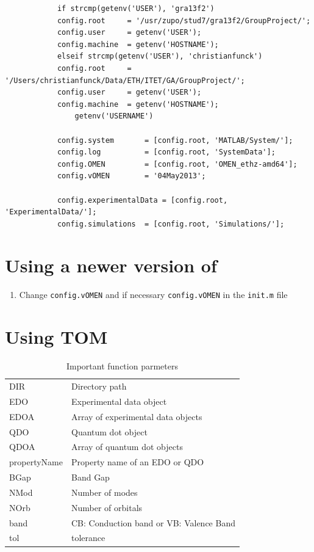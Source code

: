 		\begin{lstlisting}
			if strcmp(getenv('USER'), 'gra13f2')
		    config.root     = '/usr/zupo/stud7/gra13f2/GroupProject/';
		    config.user     = getenv('USER');
		    config.machine  = getenv('HOSTNAME');
			elseif strcmp(getenv('USER'), 'christianfunck')
		    config.root     = '/Users/christianfunck/Data/ETH/ITET/GA/GroupProject/';
		    config.user     = getenv('USER');
		    config.machine  = getenv('HOSTNAME');
		 		getenv('USERNAME')
 
			config.system       = [config.root, 'MATLAB/System/'];
			config.log          = [config.root, 'SystemData'];
			config.OMEN         = [config.root, 'OMEN_ethz-amd64'];
			config.vOMEN        = '04May2013';
		
			config.experimentalData = [config.root, 'ExperimentalData/'];
			config.simulations  = [config.root, 'Simulations/'];
		\end{lstlisting}


	\section{Using a newer version of \omen}
		\begin{enumerate}
			\item Change \lstinline{config.vOMEN} and if necessary \lstinline{config.vOMEN} in the \lstinline{init.m} file
		
		\end{enumerate}
	
	\section{Using TOM}
	
		\begin{table}[htbp]
		\begin{tabular}{ll}
			DIR						&	Directory path														\\
			EDO						& Experimental data object									\\
			EDOA					& Array of experimental data objects				\\
			QDO						& Quantum dot object												\\
			QDOA					&	Array of quantum dot objects							\\
			propertyName	& Property name of an EDO or QDO						\\
			BGap					& Band Gap																	\\
			NMod					& Number of modes														\\
			NOrb					& Number of orbitals												\\
			band					& CB: Conduction band or VB: Valence Band		\\
			tol						& tolerance																	\\
		\end{tabular}
			\caption{Important function parmeters}
			\label{tbl:functionParmeters}
		\end{table}
		
